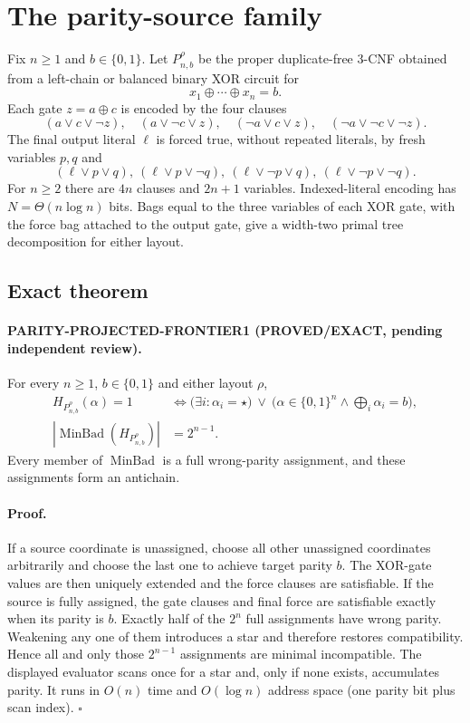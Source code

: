 \documentclass[11pt]{article}
\newcommand{\proved}{\textbf{PROVED/EXACT}}
\begin{document}
\section{The parity-source family}

Fix $n\ge1$ and $b\in\{0,1\}$.  Let $P_{n,b}^{\rho}$ be the proper
duplicate-free 3-CNF obtained from a left-chain or balanced binary XOR circuit
for
\[
x_1\oplus\cdots\oplus x_n=b.
\]
Each gate $z=a\oplus c$ is encoded by the four clauses
\[
(a\vee c\vee\neg z),\quad(a\vee\neg c\vee z),\quad
(\neg a\vee c\vee z),\quad(\neg a\vee\neg c\vee\neg z).
\]
The final output literal $\ell$ is forced true, without repeated literals, by
fresh variables $p,q$ and
\[
(\ell\vee p\vee q),\ (\ell\vee p\vee\neg q),\
(\ell\vee\neg p\vee q),\ (\ell\vee\neg p\vee\neg q).
\]
For $n\ge2$ there are $4n$ clauses and $2n+1$ variables.  Indexed-literal
encoding has $N=\Theta(n\log n)$ bits.  Bags equal to the three variables of
each XOR gate, with the force bag attached to the output gate, give a width-two
primal tree decomposition for either layout.

\subsection{Exact theorem}

\paragraph{PARITY-PROJECTED-FRONTIER1 (\proved, pending independent review).}
For every $n\ge1$, $b\in\{0,1\}$ and either layout $\rho$,
\begin{align*}
H_{P_{n,b}^{\rho}}(\alpha)=1
&\Longleftrightarrow
\bigl(\exists i:\alpha_i=\star\bigr)
\ \vee\
\bigl(\alpha\in\{0,1\}^n\land\bigoplus_i\alpha_i=b\bigr),\\
|\operatorname{MinBad}(H_{P_{n,b}^{\rho}})|&=2^{n-1}.
\end{align*}
Every member of $\operatorname{MinBad}$ is a full wrong-parity assignment, and
these assignments form an antichain.

\paragraph{Proof.}
If a source coordinate is unassigned, choose all other unassigned coordinates
arbitrarily and choose the last one to achieve target parity $b$.  The XOR-gate
values are then uniquely extended and the force clauses are satisfiable.  If
the source is fully assigned, the gate clauses and final force are satisfiable
exactly when its parity is $b$.  Exactly half of the $2^n$ full assignments have
wrong parity.  Weakening any one of them introduces a star and therefore
restores compatibility.  Hence all and only those $2^{n-1}$ assignments are
minimal incompatible.  The displayed evaluator scans once for a star and,
only if none exists, accumulates parity.  It runs in $O(n)$ time and
$O(\log n)$ address space (one parity bit plus scan index). \hfill$\square$
\end{document}
